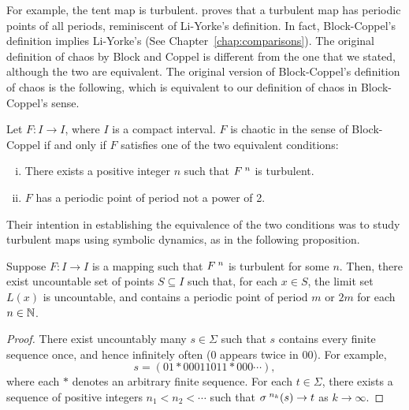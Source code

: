 \documentclass[10pt,twoside]{book}
\begin{document}
For example, the tent map is turbulent.
\citet{blockcoppel} proves that a turbulent map has periodic points of all periods, reminiscent of Li-Yorke's definition.
In fact, Block-Coppel's definition implies Li-Yorke's (See Chapter~\ref{chap:comparisons}).
The original definition of chaos by Block and Coppel is different from the one that we stated, although the two are equivalent.
The original version of Block-Coppel's definition of chaos is the following, which is equivalent to our definition of chaos in Block-Coppel's sense.
\begin{theorem}
  \citep[Chap.II]{blockcoppel}
  Let $F: I \to I$, where $I$ is a compact interval.
  $F$ is chaotic in the sense of Block-Coppel if and only if $F$ satisfies one of the two equivalent conditions:
  \begin{enumerate}[(i)]
    \item There exists a positive integer $n$ such that $F^{\;n}$ is turbulent.
    \item $F$ has a periodic point of period not a power of 2.
  \end{enumerate}
  \label{thm:blcpII}
\end{theorem}
Their intention in establishing the equivalence of the two conditions was to study turbulent maps using symbolic dynamics, as in the following proposition.
\begin{proposition}
  Suppose $F: I \to I$ is a mapping such that $F^{\;n}$ is turbulent for some $n$.
  Then, there exist uncountable set of points $S \subseteq I$ such that, for each $x \in S$, the limit set $L(x)$ is uncountable, and contains a periodic point of period $m$ or $2m$ for each $n \in \mathbb{N}$.
  \begin{proof}
    There exist uncountably many $s \in \Sigma$ such that $s$ contains every finite sequence once, and hence infinitely often (0 appears twice in 00).
    For example,
    \begin{equation*}
      s = (01*00011011*000 \cdots),
    \end{equation*}
    where each $*$ denotes an arbitrary finite sequence.
    For each $t \in \Sigma$, there exists a sequence of positive integers $n_1 < n_2 < \cdots$ such that $\sigma^{\;n_k}(s) \to t$ as $k \to \infty$.
  \end{proof}
\end{proposition}
\end{document}
